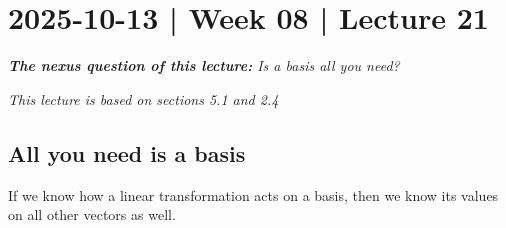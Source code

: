 \documentclass[10pt]{article}
\theoremstyle{definition}
\begin{document}
\newpage
\section{2025-10-13 | Week 08 | Lecture 21}
\begin{center}
  \begin{tcolorbox}[width=0.9\textwidth, colback=white, colframe=black]
    \textit{\textbf{The nexus question of this lecture:} Is a basis all you need? }
  \end{tcolorbox}
\end{center}

\textit{This lecture is based on sections 5.1 and 2.4}

\subsection{All you need is a basis}
If we know how a linear transformation acts on a basis, then we know its
values on all other vectors as well.
\end{document}
